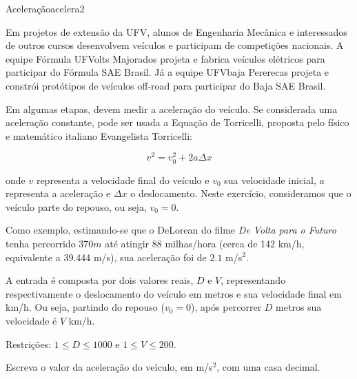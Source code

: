 \documentclass[12pt,a4paper,oneside]{article}
\begin{document}
\begin{problem}{Aceleração}{acelera}{2}

\begingroup
\setlength{\intextsep}{0pt}%

Em projetos de extensão da UFV, alunos de Engenharia Mecânica e interessados de outros cursos desenvolvem veículos e participam de competições nacionais.
A equipe Fórmula UFVolts Majorados projeta e fabrica veículos elétricos para participar do Fórmula SAE Brasil.
Já a equipe UFVbaja Pererecas projeta e constrói protótipos de veículos off-road para participar do Baja SAE Brasil.

Em algumas etapas, devem medir a aceleração do veículo. Se considerada uma aceleração constante, pode ser usada a Equação de Torricelli, proposta pelo físico e matemático italiano Evangelista Torricelli:

$$v^2 = v_0^2 + 2a\Delta x$$

onde $v$ representa a velocidade final do veículo e $v_0$ sua velocidade inicial, $a$ representa a aceleração e $\Delta x$ o deslocamento. Neste exercício, consideramos que o veículo parte do repouso, ou seja, $v_0 = 0$.

Como exemplo, estimando-se que o DeLorean do filme \textit{De Volta para o Futuro} tenha percorrido 370$m$ até atingir 88 milhas/hora (cerca de 142 km/h, equivalente a 39.444 m/s),
sua aceleração foi de $2.1$ m/s$^2$.


\InputFile

A entrada é composta por dois valores reais, $D$ e $V$, representando respectivamente o deslocamento do veículo em metros e sua velocidade final em km/h.
Ou seja, partindo do repouso ($v_0=0$), após percorrer $D$ metros sua velocidade é $V$ km/h.

Restrições: $1 \leq D \leq 1000$ e $1 \leq V \leq 200$.

\endgroup

\OutputFile

Escreva o valor da aceleração do veículo, em m/s$^2$, com uma casa decimal.


\Example

\begin{example}
%
\end{example}

\begin{example}
%
\end{example}

\begin{example}
%
\end{example}


\end{problem}
\end{document}
